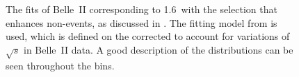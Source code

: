\begin{figure}[hbtp!]
{    }
    \caption{\label{fig:mbc_bbar_ehnhanced_fits_mc}
    The fits of Belle~II \MC corresponding to 1.6~\invab with the selection 
    that enhances non-\BtoXsgamma events, as discussed in .
    The fitting model from  is used,
    which is defined on the corrected \Mbc to account for variations of $\sqrt{s}$ in Belle~II data.
    A good description of the \Mbc distributions can be seen throughout the \EB bins.
    }
\end{figure}
